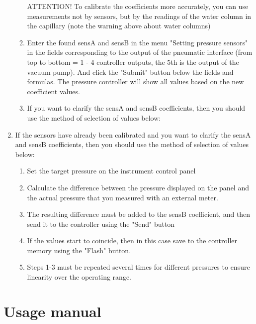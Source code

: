 \documentclass[twoside, 12pt, a4paper]{refart}
\begin{document}
\begin{enumerate}
\begin{enumerate}
ATTENTION! To calibrate the coefficients more accurately, you can use measurements not by sensors, but by the readings of the water column in the capillary (note the warning above about water columns)
            \item Enter the found sensA and sensB in the menu "Setting pressure sensors" in the fields corresponding to the output of the pneumatic interface (from top to bottom = 1 - 4 controller outputs, the 5th is the output of the vacuum pump). And click the "Submit" button below the fields and formulas. The pressure controller will show all values based on the new coefficient values.
            \item If you want to clarify the sensA and sensB coefficients, then you should use the method of selection of values below:
          \end{enumerate} 
        \item If the sensors have already been calibrated and you want to clarify the sensA and sensB coefficients, then you should use the method of selection of values below:
          \begin{enumerate} 
            \item Set the target pressure on the instrument control panel

            \item Calculate the difference between the pressure displayed on the panel and the actual pressure that you measured with an external meter.

            \item The resulting difference must be added to the sensB coefficient, and then send it to the controller using the "Send" button

            \item If the values start to coincide, then in this case save to the controller memory using the "Flash" button.

            \item Steps 1-3 must be repeated several times for different pressures to ensure linearity over the operating range.
            
          \end{enumerate}
      \end{enumerate}
        
   

  \newpage
  \section{Usage manual} 
  \label{usage}
\end{document}
